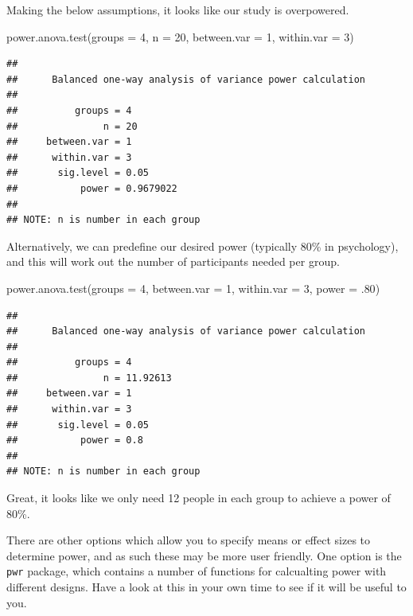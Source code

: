 \documentclass[
]{book}
\newenvironment{Shaded}{\begin{snugshade}}{\end{snugshade}}
\newcommand{\AttributeTok}[1]{\textcolor[rgb]{0.77,0.63,0.00}{#1}}
\newcommand{\DecValTok}[1]{\textcolor[rgb]{0.00,0.00,0.81}{#1}}
\newcommand{\FunctionTok}[1]{\textcolor[rgb]{0.00,0.00,0.00}{#1}}
\newcommand{\NormalTok}[1]{#1}
\begin{document}
Making the below assumptions, it looks like our study is overpowered.

\begin{Shaded}
\begin{Highlighting}[]
\FunctionTok{power.anova.test}\NormalTok{(}\AttributeTok{groups =} \DecValTok{4}\NormalTok{, }\AttributeTok{n =} \DecValTok{20}\NormalTok{, }\AttributeTok{between.var =} \DecValTok{1}\NormalTok{, }\AttributeTok{within.var =} \DecValTok{3}\NormalTok{)}
\end{Highlighting}
\end{Shaded}

\begin{verbatim}
## 
##      Balanced one-way analysis of variance power calculation 
## 
##          groups = 4
##               n = 20
##     between.var = 1
##      within.var = 3
##       sig.level = 0.05
##           power = 0.9679022
## 
## NOTE: n is number in each group
\end{verbatim}

Alternatively, we can predefine our desired power (typically 80\% in psychology), and this will work out the number of participants needed per group.

\begin{Shaded}
\begin{Highlighting}[]
\FunctionTok{power.anova.test}\NormalTok{(}\AttributeTok{groups =} \DecValTok{4}\NormalTok{, }\AttributeTok{between.var =} \DecValTok{1}\NormalTok{, }\AttributeTok{within.var =} \DecValTok{3}\NormalTok{, }\AttributeTok{power =}\NormalTok{ .}\DecValTok{80}\NormalTok{)}
\end{Highlighting}
\end{Shaded}

\begin{verbatim}
## 
##      Balanced one-way analysis of variance power calculation 
## 
##          groups = 4
##               n = 11.92613
##     between.var = 1
##      within.var = 3
##       sig.level = 0.05
##           power = 0.8
## 
## NOTE: n is number in each group
\end{verbatim}

Great, it looks like we only need 12 people in each group to achieve a power of 80\%.

There are other options which allow you to specify means or effect sizes to determine power, and as such these may be more user friendly. One option is the \texttt{pwr} package, which contains a number of functions for calcualting power with different designs. Have a look at this in your own time to see if it will be useful to you.
\end{document}
